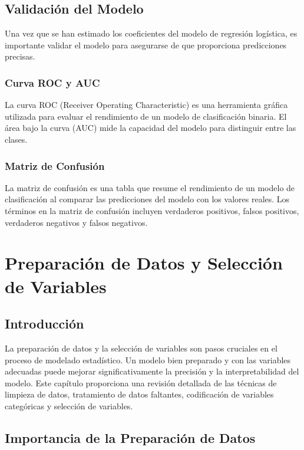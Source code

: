 \documentclass[a4paper]{report} %
\begin{document}
\section{Validaci\'on del Modelo}

Una vez que se han estimado los coeficientes del modelo de regresi\'on log\'istica, es importante validar el modelo para asegurarse de que proporciona predicciones precisas.

\subsection{Curva ROC y AUC}

La curva ROC (Receiver Operating Characteristic) es una herramienta gr\'afica utilizada para evaluar el rendimiento de un modelo de clasificaci\'on binaria. El \'area bajo la curva (AUC) mide la capacidad del modelo para distinguir entre las clases.

\subsection{Matriz de Confusi\'on}

La matriz de confusi\'on es una tabla que resume el rendimiento de un modelo de clasificaci\'on al comparar las predicciones del modelo con los valores reales. Los t\'erminos en la matriz de confusi\'on incluyen verdaderos positivos, falsos positivos, verdaderos negativos y falsos negativos.



\chapter{Preparación de Datos y Selección de Variables}


\section{Introducci\'on}

La preparaci\'on de datos y la selecci\'on de variables son pasos cruciales en el proceso de modelado estad\'istico. Un modelo bien preparado y con las variables adecuadas puede mejorar significativamente la precisi\'on y la interpretabilidad del modelo. Este cap\'itulo proporciona una revisi\'on detallada de las t\'ecnicas de limpieza de datos, tratamiento de datos faltantes, codificaci\'on de variables categ\'oricas y selecci\'on de variables.

\section{Importancia de la Preparaci\'on de Datos}
\end{document}
